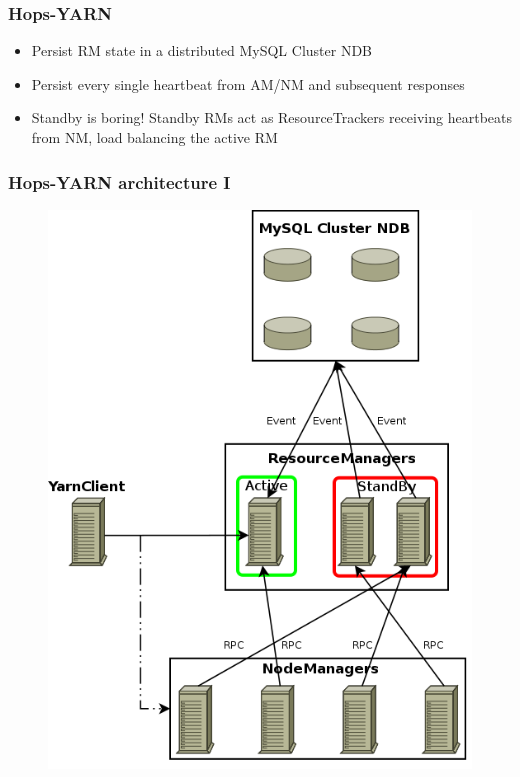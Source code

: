 \documentclass{beamer}
\begin{document}
\begin{frame}
\frametitle{Hops-YARN}

\begin{itemize}
\item Persist RM state in a distributed MySQL Cluster NDB

\item Persist every single heartbeat from AM/NM and subsequent responses

\item<2-> Standby is boring! Standby RMs act as ResourceTrackers
  receiving heartbeats from NM, load balancing the active RM
\end{itemize}
\end{frame}

\begin{frame}
\frametitle{Hops-YARN architecture I}

\begin{figure}
\centering
\includegraphics[scale=0.3]{resources/hopsyarn_arch_overview.png}
\end{figure}
\end{frame}
\end{document}
